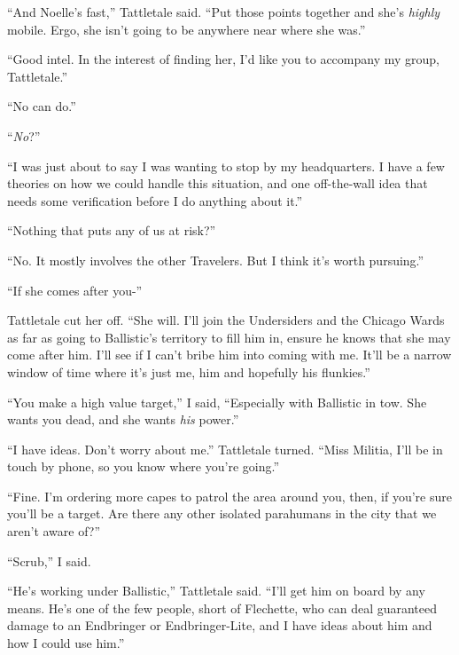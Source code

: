 ``And Noelle's fast,'' Tattletale said.  ``Put those points together and she's \emph{highly} mobile.  Ergo, she isn't going to be anywhere near where she was.''



``Good intel.  In the interest of finding her, I'd like you to accompany my group, Tattletale.''



``No can do.''



``\emph{No}?''



``I was just about to say I was wanting to stop by my headquarters.  I have a few theories on how we could handle this situation, and one off-the-wall idea that needs some verification before I do anything about it.''



``Nothing that puts any of us at risk?''



``No.  It mostly involves the other Travelers.  But I think it's worth pursuing.''



``If she comes after you-''



Tattletale cut her off.  ``She will.  I'll join the Undersiders and the Chicago Wards as far as going to Ballistic's territory to fill him in, ensure he knows that she may come after him.  I'll see if I can't bribe him into coming with me.  It'll be a narrow window of time where it's just me, him and hopefully his flunkies.''



``You make a high value target,'' I said, ``Especially with Ballistic in tow.  She wants you dead, and she wants \emph{his} power.''



``I have ideas.  Don't worry about me.'' Tattletale turned.  ``Miss Militia, I'll be in touch by phone, so you know where you're going.''



``Fine.  I'm ordering more capes to patrol the area around you, then, if you're sure you'll be a target.  Are there any other isolated parahumans in the city that we aren't aware of?''



``Scrub,'' I said.



``He's working under Ballistic,'' Tattletale said.  ``I'll get him on board by any means.  He's one of the few people, short of Flechette, who can deal guaranteed damage to an Endbringer or Endbringer-Lite, and I have ideas about him and how I could use him.''



